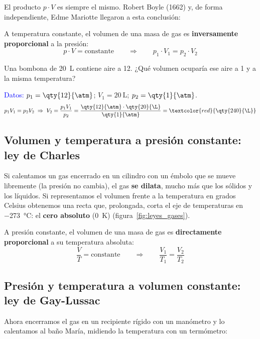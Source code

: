 El producto \(p \cdot V\) es siempre el mismo. Robert Boyle (1662) y, de forma independiente, Edme Mariotte llegaron a esta conclusión:

\begin{definition}
    A temperatura constante, el volumen de una masa de gas es \textbf{inversamente proporcional} a la presión:
    \[ p \cdot V = \text{constante} \qquad\Rightarrow\qquad p_1 \cdot V_1 = p_2 \cdot V_2 \]
\end{definition}

\begin{example}
    Una bombona de \qty{20}{\L} contiene aire a \qty{12}{\atm}. ¿Qué volumen ocuparía ese aire a \qty{1}{\atm} y a la misma temperatura?

    \textcolor{blue}{Datos:} \(p_1 = \qty{12}{\atm}\); \(V_1 = \qty{20}{\L}\); \(p_2 = \qty{1}{\atm}\).
    \[ p_1 V_1 = p_2 V_2 \;\Rightarrow\; V_2 = \frac{p_1 V_1}{p_2} = \frac{\qty{12}{\atm} \cdot \qty{20}{\L}}{\qty{1}{\atm}} = \textcolor{red}{\qty{240}{\L}} \]
\end{example}

\subsection{Volumen y temperatura a presión constante: ley de Charles}

Si calentamos un gas encerrado en un cilindro con un émbolo que se mueve libremente (la presión no cambia), el gas \textbf{se dilata}, mucho más que los sólidos y los líquidos. Si representamos el volumen frente a la temperatura en grados Celsius obtenemos una recta que, prolongada, corta el eje de temperaturas en \qty{-273}{\celsius}: el \textbf{cero absoluto} (\qty{0}{\kelvin}) (figura~\ref{fig:leyes_gases}).

\begin{definition}
    A presión constante, el volumen de una masa de gas es \textbf{directamente proporcional} a su temperatura absoluta:
    \[ \frac{V}{T} = \text{constante} \qquad\Rightarrow\qquad \frac{V_1}{T_1} = \frac{V_2}{T_2} \]
\end{definition}

\subsection{Presión y temperatura a volumen constante: ley de Gay-Lussac}

Ahora encerramos el gas en un recipiente rígido con un manómetro y lo calentamos al baño María, midiendo la temperatura con un termómetro:

